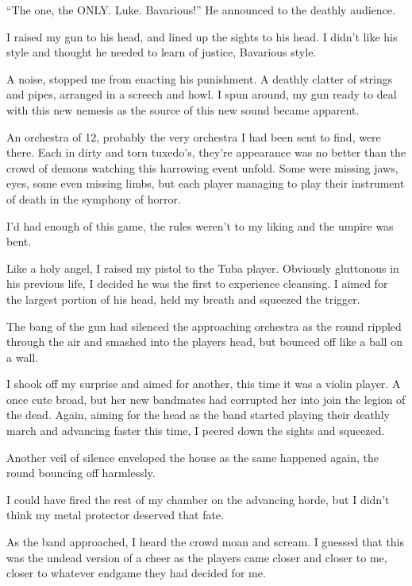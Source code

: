 ``The one, the ONLY. Luke. Bavarious!'' He announced to
the deathly audience.

I raised my gun to his head, and lined up the sights to his head. I
didn't like his style and thought he needed to learn of
justice, Bavarious style.



A noise, stopped me from enacting his punishment. A deathly clatter
of strings and pipes, arranged in a screech and howl. I spun
around, my gun ready to deal with this new nemesis as the source of
this new sound became apparent.

An orchestra of 12, probably the very orchestra I had been sent to
find, were there. Each in dirty and torn tuxedo's,
they're appearance was no better than the crowd of demons
watching this harrowing event unfold. Some were missing jaws, eyes,
some even missing limbs, but each player managing to play their
instrument of death in the symphony of horror.



I'd had enough of this game, the rules weren't to my
liking and the umpire was bent.

Like a holy angel, I raised my pistol to the Tuba player. Obviously
gluttonous in his previous life, I decided he was the first to
experience cleansing. I aimed for the largest portion of his head,
held my breath and squeezed the trigger.

The bang of the gun had silenced the approaching orchestra as the
round rippled through the air and smashed into the players head,
but bounced off like a ball on a wall.



I shook off my surprise and aimed for another, this time it was a
violin player. A once cute broad, but her new bandmates had
corrupted her into join the legion of the dead. Again, aiming for
the head as the band started playing their deathly march and
advancing faster this time, I peered down the sights and
squeezed.

Another veil of silence enveloped the house as the same happened
again, the round bouncing off harmlessly.



I could have fired the rest of my chamber on the advancing horde,
but I didn't think my metal protector deserved that
fate.

As the band approached, I heard the crowd moan and scream. I
guessed that this was the undead version of a cheer as the players
came closer and closer to me, closer to whatever endgame they had
decided for me.

